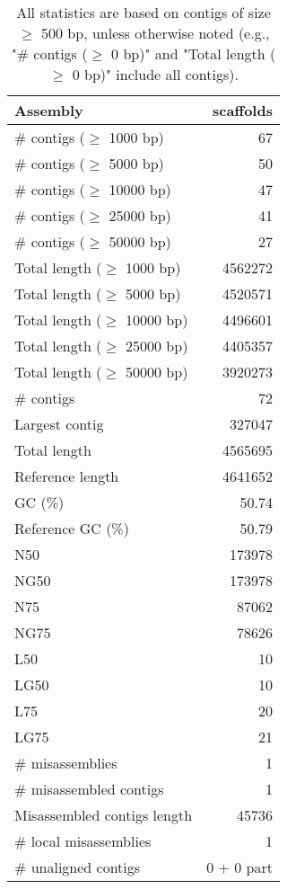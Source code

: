 \documentclass[12pt,a4paper]{article}
\begin{document}
\begin{table}[ht]
\begin{center}
\caption{All statistics are based on contigs of size $\geq$ 500 bp, unless otherwise noted (e.g., "\# contigs ($\geq$ 0 bp)" and "Total length ($\geq$ 0 bp)" include all contigs).}
\begin{tabular}{|l*{1}{|r}|}
\hline
Assembly & scaffolds \\ \hline
\# contigs ($\geq$ 1000 bp) & 67 \\ \hline
\# contigs ($\geq$ 5000 bp) & 50 \\ \hline
\# contigs ($\geq$ 10000 bp) & 47 \\ \hline
\# contigs ($\geq$ 25000 bp) & 41 \\ \hline
\# contigs ($\geq$ 50000 bp) & 27 \\ \hline
Total length ($\geq$ 1000 bp) & 4562272 \\ \hline
Total length ($\geq$ 5000 bp) & 4520571 \\ \hline
Total length ($\geq$ 10000 bp) & 4496601 \\ \hline
Total length ($\geq$ 25000 bp) & 4405357 \\ \hline
Total length ($\geq$ 50000 bp) & 3920273 \\ \hline
\# contigs & 72 \\ \hline
Largest contig & 327047 \\ \hline
Total length & 4565695 \\ \hline
Reference length & 4641652 \\ \hline
GC (\%) & 50.74 \\ \hline
Reference GC (\%) & 50.79 \\ \hline
N50 & 173978 \\ \hline
NG50 & 173978 \\ \hline
N75 & 87062 \\ \hline
NG75 & 78626 \\ \hline
L50 & 10 \\ \hline
LG50 & 10 \\ \hline
L75 & 20 \\ \hline
LG75 & 21 \\ \hline
\# misassemblies & 1 \\ \hline
\# misassembled contigs & 1 \\ \hline
Misassembled contigs length & 45736 \\ \hline
\# local misassemblies & 1 \\ \hline
\# unaligned contigs & 0 + 0 part \\ \hline

\end{tabular}
\end{center}
\end{table}
\end{document}
